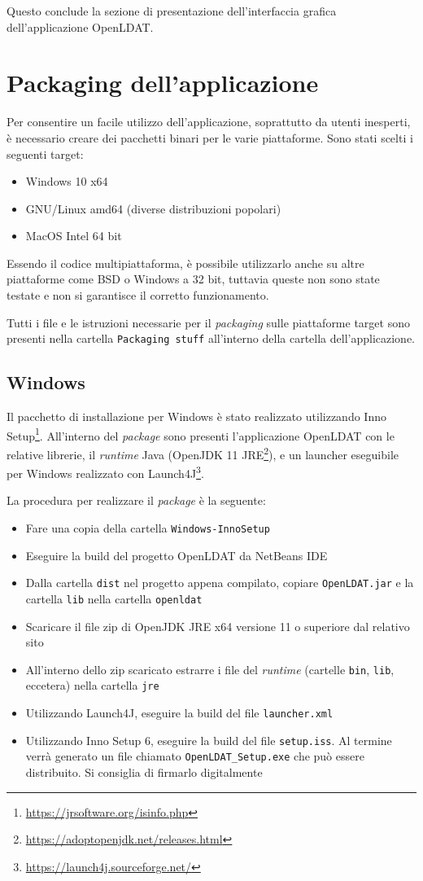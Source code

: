 Questo conclude la sezione di presentazione dell'interfaccia grafica dell'applicazione OpenLDAT.

\section{Packaging dell'applicazione}
Per consentire un facile utilizzo dell'applicazione, soprattutto da utenti inesperti, è necessario creare dei pacchetti binari per le varie piattaforme. Sono stati scelti i seguenti target:\begin{itemize}
	\item Windows 10 x64
	\item GNU/Linux amd64 (diverse distribuzioni popolari)
	\item MacOS Intel 64 bit
\end{itemize}
Essendo il codice multipiattaforma, è possibile utilizzarlo anche su altre piattaforme come BSD o Windows a 32 bit, tuttavia queste non sono state testate e non si garantisce il corretto funzionamento.

Tutti i file e le istruzioni necessarie per il \textit{packaging} sulle piattaforme target sono presenti nella cartella \texttt{Packaging stuff} all'interno della cartella dell'applicazione.

\subsection{Windows}
Il pacchetto di installazione per Windows è stato realizzato utilizzando Inno Setup\footnote{\url{https://jrsoftware.org/isinfo.php}}. All'interno del \textit{package} sono presenti l'applicazione OpenLDAT con le relative librerie, il \textit{runtime} Java (OpenJDK 11 JRE\footnote{\url{https://adoptopenjdk.net/releases.html}}), e un launcher eseguibile per Windows realizzato con Launch4J\footnote{\url{https://launch4j.sourceforge.net/}}.

La procedura per realizzare il \textit{package} è la seguente:\begin{itemize}
	\item Fare una copia della cartella \texttt{Windows-InnoSetup}
	\item Eseguire la build del progetto OpenLDAT da NetBeans IDE
	\item Dalla cartella \texttt{dist} nel progetto appena compilato, copiare \texttt{OpenLDAT.jar} e la cartella \texttt{lib} nella cartella \texttt{openldat}
	\item Scaricare il file zip di OpenJDK JRE x64 versione 11 o superiore dal relativo sito
	\item All'interno dello zip scaricato estrarre i file del \textit{runtime} (cartelle \texttt{bin}, \texttt{lib}, eccetera) nella cartella \texttt{jre}
	\item Utilizzando Launch4J, eseguire la build del file \texttt{launcher.xml}
	\item Utilizzando Inno Setup 6, eseguire la build del file \texttt{setup.iss}. Al termine verrà generato un file chiamato \texttt{OpenLDAT\_Setup.exe} che può essere distribuito. Si consiglia di firmarlo digitalmente
\end{itemize}

